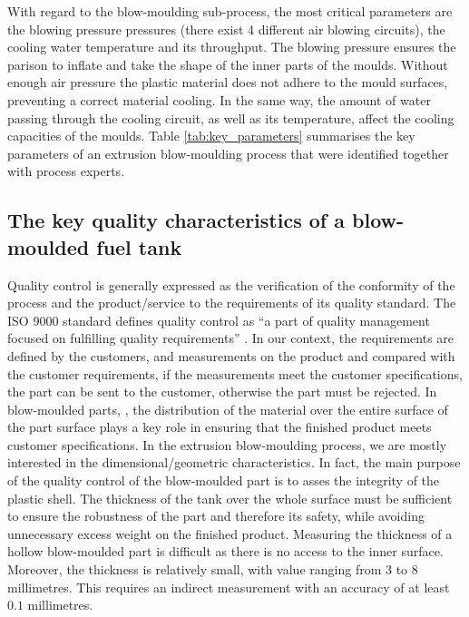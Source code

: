 With regard to the blow-moulding sub-process, the most critical parameters are the blowing pressure pressures (there exist 4 different air blowing circuits), the cooling water temperature and its throughput. The blowing pressure ensures the parison to inflate and take the shape of the inner parts of the moulds. Without enough air pressure the plastic material does not adhere to the mould surfaces, preventing a correct material cooling. In the same way, the amount of water passing through the cooling circuit, as well as its temperature, affect the cooling capacities of the moulds. Table \ref{tab:key_parameters} summarises the key parameters of an extrusion blow-moulding process that were identified together with process experts.

\subsection{The key quality characteristics of a blow-moulded fuel tank} \label{The key quality characteristics of a blow-moulded fuel tank}

Quality control is generally expressed as  the verification of the conformity of the process and the product/service to the requirements of its quality standard. The ISO 9000 standard defines quality control as ``a part of quality management focused on fulfilling quality requirements'' \citep{iso9000}. In our context, the requirements are defined by the customers, and measurements on the product and compared with the customer requirements, if the measurements meet the customer specifications, the part can be sent to the customer, otherwise the part must be rejected. In blow-moulded parts, , the distribution of the material over the entire surface of the part surface plays a key role in ensuring that the finished product meets customer specifications. In the extrusion blow-moulding process, we are mostly interested in the dimensional/geometric characteristics. In fact, the main purpose of the quality control of the blow-moulded part is to asses the integrity of the plastic shell. The thickness of the tank over the whole surface must be sufficient to ensure the robustness of the part and therefore its safety, while avoiding unnecessary excess weight on the finished product. Measuring the thickness of a hollow blow-moulded part is difficult as there is no access to the inner surface. Moreover, the thickness is relatively small, with value ranging from $3$ to $8$ millimetres. This requires an indirect measurement with an accuracy of at least $0.1$ millimetres.

